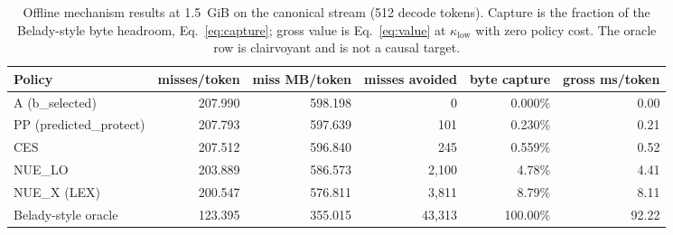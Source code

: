 \begin{table}[t]
\centering
\caption{Offline mechanism results at 1.5~GiB on the canonical stream (512 decode tokens). Capture is the fraction of the Belady-style byte headroom, Eq.~\eqref{eq:capture}; gross value is Eq.~\eqref{eq:value} at $\kappa_{\mathrm{low}}$ with zero policy cost. The oracle row is clairvoyant and is not a causal target.}
\label{tab:mech}
\small
\begin{tabular}{lrrrrr}
\toprule
Policy & misses/token & miss MB/token & misses avoided & byte capture & gross ms/token \\
\midrule
A (b\_selected) & 207.990 & 598.198 & 0 & 0.000\% & 0.00 \\
PP (predicted\_protect) & 207.793 & 597.639 & 101 & 0.230\% & 0.21 \\
CES & 207.512 & 596.840 & 245 & 0.559\% & 0.52 \\
NUE\_LO & 203.889 & 586.573 & 2{,}100 & 4.78\% & 4.41 \\
NUE\_X (LEX) & 200.547 & 576.811 & 3{,}811 & 8.79\% & 8.11 \\
Belady-style oracle & 123.395 & 355.015 & 43{,}313 & 100.00\% & 92.22 \\
\bottomrule
\end{tabular}
\end{table}
